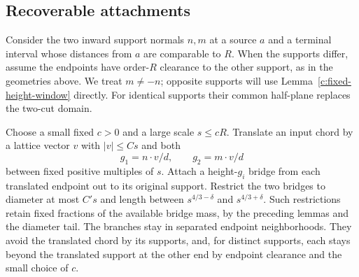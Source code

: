 \subsection{Recoverable attachments}

Consider the two inward support normals $n,m$ at a source $a$ and a
terminal interval whose distances from $a$ are comparable to $R$.
When the supports differ, assume the endpoints have order-$R$ clearance
to the other support, as in the geometries above. We treat $m\ne-n$;
opposite supports will use Lemma~\ref{c:fixed-height-window} directly.
For identical supports their common half-plane replaces the two-cut
domain.

Choose a small fixed $c>0$ and a large scale $s\le cR$. Translate an
input chord by a lattice vector $v$ with $|v|\le Cs$ and both
\[
 g_1=n\cdot v/d,\qquad g_2=m\cdot v/d
\]
between fixed positive multiples of $s$. Attach a height-$g_i$ bridge
from each translated endpoint out to its original support. Restrict the
two bridges to diameter at most $C's$ and length between
$s^{4/3-\delta}$ and $s^{4/3+\delta}$. Such restrictions retain fixed
fractions of the available bridge mass, by the preceding lemmas and the
diameter tail. The branches stay in separated endpoint neighborhoods.
They avoid the translated chord by its supports, and, for distinct
supports, each stays beyond the translated support at the other end
by endpoint clearance and the small choice of $c$.

